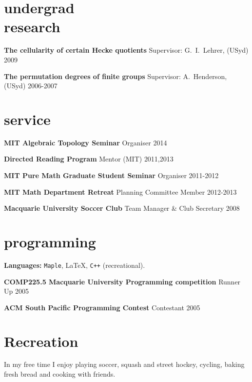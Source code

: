 \documentclass[margin,line]{resume}
\newcommand{\CVsection}[1]{\section{\mysidestyle #1}}
\newcommand{\entry}[3]{\textbf{#1} #2 \hfill {#3}
           
\vspace{-2.7mm}}
\newcommand{\FINALentry}[3]{\textbf{#1} #2 \hfill {#3}}
\begin{document}
\begin{resume}
\CVsection{undergrad \\ research}

\entry{The cellularity of certain Hecke quotients}{Supervisor: G.\ I.\ Lehrer, (USyd)}{2009}
\FINALentry{The permutation degrees of finite groups}{Supervisor: A.\ Henderson, (USyd)}{2006-2007}


\CVsection{service}

\entry{MIT Algebraic Topology Seminar}{Organiser}{2014}
\entry{Directed Reading Program}{Mentor (MIT)}{2011,2013}
\entry{MIT Pure Math Graduate Student Seminar}{Organiser}{2011-2012}
\entry{MIT Math Department Retreat}{Planning Committee Member}{2012-2013}
\FINALentry{Macquarie University Soccer Club}{Team Manager \& Club Secretary}{2008}


\CVsection{programming}

\entry{Languages:}{\texttt{Maple}, \LaTeX, \texttt{C++} (recreational).}{}
\entry{COMP225.5 Macquarie University Programming competition}{Runner Up}{2005}
\FINALentry{ACM South Pacific Programming Contest}{Contestant}{2005}


\CVsection{Recreation}

In my free time I enjoy playing soccer, squash and street hockey, cycling, baking \\fresh bread and cooking with friends.


%
%



\end{resume}
\end{document}
